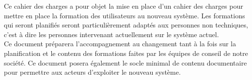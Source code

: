 Ce cahier des charges a pour objet la mise en place d'un cahier des charges pour mettre en place la formation des utilisateurs au nouveau système. Les formations qui seront planifiés seront particulièrement adaptés aux personnes non techniques, c'est à dire les personnes intervenant actuellement sur le système actuel. \\

Ce document préparera l'accompagnement au changement tant à la fois sur la planification et le contenu des formations faites par les équipes de conseil de notre société. Ce document posera
également le socle minimal de contenu documentaire pour permettre aux acteurs d'exploiter le nouveau système.


\pagebreak


